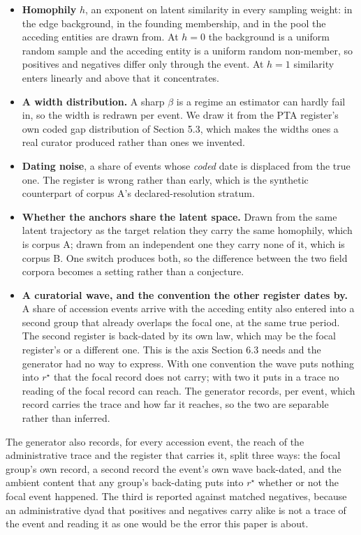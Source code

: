 \documentclass[twoside,11pt]{article}
\providecommand{\tightlist}{%
  \setlength{\itemsep}{0pt}\setlength{\parskip}{0pt}}
\begin{document}
\begin{itemize}
\tightlist
\item
  \textbf{Homophily} \(h\), an exponent on latent similarity in every sampling weight: in the edge background, in the founding membership, and in the pool the acceding entities are drawn from. At \(h = 0\) the background is a uniform random sample and the acceding entity is a uniform random non-member, so positives and negatives differ only through the event. At \(h = 1\) similarity enters linearly and above that it concentrates.
\item
  \textbf{A width distribution.} A sharp \(\beta\) is a regime an estimator can hardly fail in, so the width is redrawn per event. We draw it from the PTA register's own coded gap distribution of Section 5.3, which makes the widths ones a real curator produced rather than ones we invented.
\item
  \textbf{Dating noise}, a share of events whose \emph{coded} date is displaced from the true one. The register is wrong rather than early, which is the synthetic counterpart of corpus A's declared-resolution stratum.
\item
  \textbf{Whether the anchors share the latent space.} Drawn from the same latent trajectory as the target relation they carry the same homophily, which is corpus A; drawn from an independent one they carry none of it, which is corpus B. One switch produces both, so the difference between the two field corpora becomes a setting rather than a conjecture.
\item
  \textbf{A curatorial wave, and the convention the other register dates by.} A share of accession events arrive with the acceding entity also entered into a second group that already overlaps the focal one, at the same true period. The second register is back-dated by its own law, which may be the focal register's or a different one. This is the axis Section 6.3 needs and the generator had no way to express. With one convention the wave puts nothing into \(r^{\star}\) that the focal record does not carry; with two it puts in a trace no reading of the focal record can reach. The generator records, per event, which record carries the trace and how far it reaches, so the two are separable rather than inferred.
\end{itemize}

The generator also records, for every accession event, the reach of the administrative trace and the register that carries it, split three ways: the focal group's own record, a second record the event's own wave back-dated, and the ambient content that any group's back-dating puts into \(r^{\star}\) whether or not the focal event happened. The third is reported against matched negatives, because an administrative dyad that positives and negatives carry alike is not a trace of the event and reading it as one would be the error this paper is about.
\end{document}
